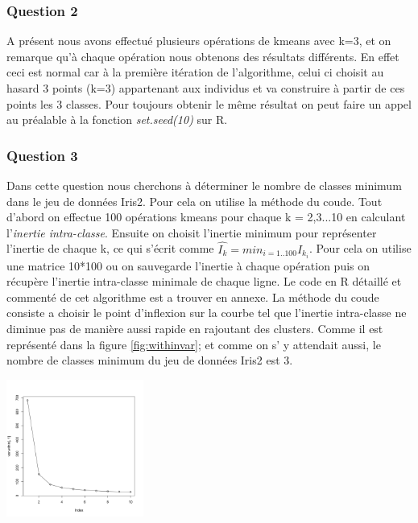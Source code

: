 \documentclass[10pt]{article}
\begin{document}
\subsubsection{Question 2}

A présent nous avons effectué plusieurs opérations de kmeans avec k=3, et on remarque qu'à chaque opération nous obtenons des résultats différents. En effet ceci est normal car à la première itération de l'algorithme, celui ci choisit au hasard 3 points (k=3) appartenant aux individus et va construire à partir de ces points les 3 classes. Pour toujours obtenir le même résultat on peut faire un appel  au préalable à la fonction \textit{set.seed(10)} sur R.
	
\subsubsection{Question 3}	
	
Dans cette question nous cherchons à déterminer le nombre de classes minimum dans le jeu de données Iris2. Pour cela on utilise la méthode du coude.  Tout d'abord on effectue 100 opérations kmeans pour chaque k = 2,3...10 en calculant l'\textit{inertie intra-classe}. Ensuite on choisit l'inertie minimum pour représenter l'inertie de chaque k, ce qui s'écrit comme $\hat{I_{k}} = min_{i=1..100} I_{k_{i}}$. Pour cela on utilise une matrice 10*100 ou on sauvegarde l'inertie à chaque opération puis on récupère l'inertie intra-classe minimale de chaque ligne. Le code en R détaillé et commenté de cet algorithme est a trouver en annexe.
La méthode du coude consiste a choisir le point d'inflexion sur la courbe tel que l'inertie intra-classe ne diminue pas de manière aussi rapide en rajoutant des clusters.  Comme il est représenté dans la figure \ref{fig:withinvar}; et comme on s' y attendait aussi, le nombre de classes minimum du jeu de données Iris2 est 3. \\
	
\begin{center}
	\includegraphics[width=45mm]{Figures/Iris_2/withinvar.png}
	\label{fig:withinvar}
\end{center}
\end{document}
